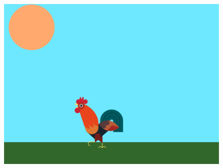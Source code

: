\documentclass[10pt, a4paper]{article}
\begin{document}
\begin{enumerate}
\begin{figure}[htb]
\begin{minipage}[t]{.24\textwidth}
            \end{minipage}
            \begin{minipage}[t]{.24\textwidth}
                \centering
                \includegraphics[width=.9\textwidth]{37-5.png}
            \end{minipage}
        \end{figure}
    \end{enumerate}
\end{document}
